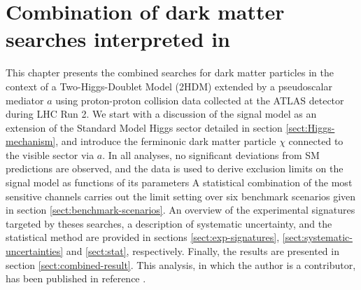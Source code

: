 \chapter{Combination of dark matter searches interpreted in \thdma}
\label{chap:combination-dark-matter-2hdma}

This chapter presents the combined searches for dark matter particles in the context of a Two-Higgs-Doublet Model (2HDM) extended by a pseudoscalar mediator $a$ using proton-proton collision data collected at the ATLAS detector during LHC Run 2. 
We start with a discussion of the signal model as an extension of the Standard Model Higgs sector detailed in section \ref{sect:Higgs-mechanism}, and introduce the ferminonic dark matter particle $\chi$ connected to the visible sector via $a$.
In all analyses, no significant deviations from SM predictions are observed, and the data is used to derive exclusion limits on the signal model as functions of its parameters
A statistical combination of the most sensitive channels carries out the limit setting over six benchmark scenarios given in section \ref{sect:benchmark-scenarios}.
An overview of the experimental signatures targeted by theses searches, a description of systematic uncertainty, and the statistical method are provided in sections \ref{sect:exp-signatures}, \ref{sect:systematic-uncertainties} and \ref{sect:stat}, respectively.
Finally, the results are presented in section \ref{sect:combined-result}.
This analysis, in which the author is a contributor, has been published in reference \cite{2hdma_comb}.
 
